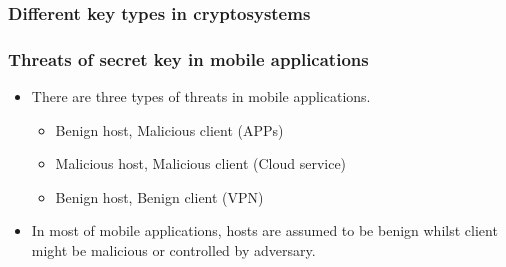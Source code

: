 \documentclass{beamer}
\begin{document}
\frame
{
\frametitle{Different key types in cryptosystems}
\begin{center}
\end{center}
}

\frame
{
\frametitle{Threats of secret key in mobile applications}
\begin{itemize}
 \setlength{\itemsep}{12pt}
\item There are three types of threats in mobile applications.
\begin{itemize}
\setlength{\itemsep}{12pt}
\item Benign host, Malicious client (APPs)
\item Malicious host, Malicious client (Cloud service)
\item Benign host, Benign client (VPN)
\end{itemize}
\setlength{\itemsep}{12pt}
\item In most of mobile applications, hosts are assumed to be benign whilst client might be malicious or controlled by adversary.
\end{itemize}
}
\end{document}
